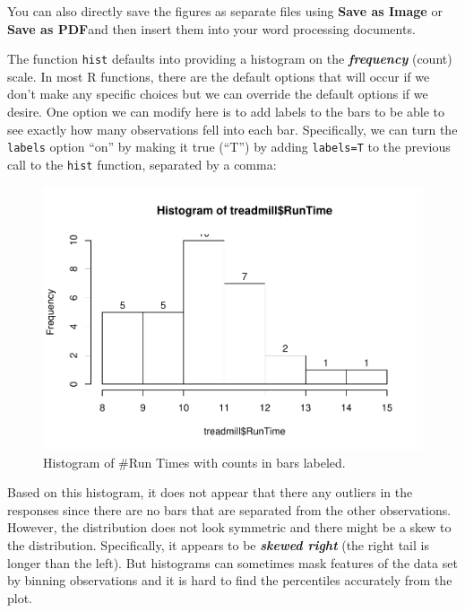 \documentclass[]{book}
\newenvironment{Shaded}{\begin{snugshade}}{\end{snugshade}}
\newcommand{\KeywordTok}[1]{\textcolor[rgb]{0.13,0.29,0.53}{\textbf{#1}}}
\newcommand{\DataTypeTok}[1]{\textcolor[rgb]{0.13,0.29,0.53}{#1}}
\newcommand{\OperatorTok}[1]{\textcolor[rgb]{0.81,0.36,0.00}{\textbf{#1}}}
\newcommand{\NormalTok}[1]{#1}
\begin{document}
You can also directly save the figures as separate files using
\textbf{Save as Image} or \textbf{Save as PDF}and then insert them into
your word processing documents.

The function \texttt{hist} defaults into providing a histogram on the
\textbf{\emph{frequency}} (count) scale. In most R functions, there are
the default options that will occur if we don't make any specific
choices but we can override the default options if we desire. One option
we can modify here is to add labels to the bars to be able to see
exactly how many observations fell into each bar. Specifically, we can
turn the \texttt{labels} option ``on'' by making it true (``T'') by
adding \texttt{labels=T} to the previous call to the \texttt{hist}
function, separated by a comma:



\begin{Shaded}
\end{Shaded}

\begin{figure}
\centering
\includegraphics{GreenwoodBanner_files/figure-latex/Figure7-1.pdf}
\caption{\label{fig:Figure7}Histogram of \#Run Times with counts in bars labeled.}
\end{figure}

Based on this histogram, it does not appear that there any outliers in
the responses since there are no bars that are separated from the other
observations. However, the distribution does not look symmetric and
there might be a skew to the distribution. Specifically, it appears to
be \textbf{\emph{skewed right}} (the right tail is longer than the
left). But histograms can sometimes mask features of the data set by
binning observations and it is hard to find the percentiles accurately
from the plot.
\end{document}
